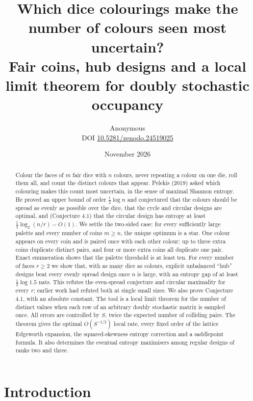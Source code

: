 \documentclass[11pt,a4paper]{article}
\title{\vspace{-1.9em}\textcolor{ink}{Which dice colourings make the number of colours seen most uncertain?\\[2pt]\large Fair coins, hub designs and a local limit theorem for doubly stochastic occupancy}}
\author{Anonymous\\[3pt]{\small DOI \href{https://doi.org/10.5281/zenodo.24519025}{10.5281/zenodo.24519025}}}
\date{November 2026}
\theoremstyle{definition}\newtheorem{remark}[theorem]{Remark}\newtheorem{conjecture}{Conjecture}
\begin{document}
\maketitle
\begin{abstract}
Colour the faces of $m$ fair dice with $n$ colours, never repeating a colour on one die, roll them all, and count the distinct colours that appear. Pelekis (2019) asked which colouring makes this count most uncertain, in the sense of maximal Shannon entropy. He proved an upper bound of order $\tfrac12\log n$ and conjectured that the colours should be spread as evenly as possible over the dice, that the cycle and circular designs are optimal, and (Conjecture 4.1) that the circular design has entropy at least $\tfrac12\log_2(n/r)-O(1)$. We settle the two-sided case: for every sufficiently large palette and every number of coins $m\ge n$, the unique optimum is a star. One colour appears on every coin and is paired once with each other colour; up to three extra coins duplicate distinct pairs, and four or more extra coins all duplicate one pair. Exact enumeration shows that the palette threshold is at least ten. For every number of faces $r\ge2$ we show that, with as many dice as colours, explicit unbalanced ``hub'' designs beat every evenly spread design once $n$ is large, with an entropy gap of at least $\tfrac12\log 1.5$ nats. This refutes the even-spread conjecture and circular maximality for every $r$; earlier work had refuted both at single small sizes. We also prove Conjecture 4.1, with an absolute constant. The tool is a local limit theorem for the number of distinct values when each row of an arbitrary doubly stochastic matrix is sampled once. All errors are controlled by $S$, twice the expected number of colliding pairs. The theorem gives the optimal $O(S^{-1/2})$ local rate, every fixed order of the lattice Edgeworth expansion, the squared-skewness entropy correction and a saddlepoint formula. It also determines the eventual entropy maximisers among regular designs of ranks two and three.
\end{abstract}

\section{Introduction}\label{sec:intro}
\end{document}
